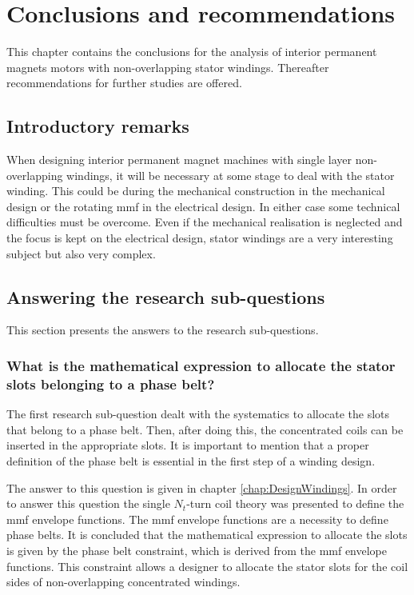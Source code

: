 \chapter{Conclusions and recommendations}\label{chap:ConlusionsRecommendations}
This chapter contains the conclusions for the analysis of interior permanent magnets motors with non-overlapping stator windings. Thereafter recommendations for further studies are offered.

\section{Introductory remarks}
When designing interior permanent magnet machines with single layer non-overlapping windings, it will be necessary at some stage to deal with the stator winding. This could be during the mechanical construction in the mechanical design or the rotating mmf in the electrical design. In either case some technical difficulties must be overcome. Even if the mechanical realisation is neglected and the focus is kept on the electrical design, stator windings are a very interesting subject but also very complex. 

\section{Answering the research sub-questions}
This section presents the answers to the research sub-questions.
 
\subsection[What is the mathematical expression to allocate the stator slots?]{What is the mathematical expression to allocate the stator slots belonging to a phase belt?}
The first research sub-question dealt with the systematics to allocate the slots that belong to a phase belt. Then, after doing this, the concentrated coils can be inserted in the appropriate slots. It is important to mention that a proper definition of the phase belt is essential in the first step of a winding design.

The answer to this question is given in chapter \ref{chap:DesignWindings}. In order to answer this question the single $N_t$-turn coil theory was presented to define the mmf envelope functions. The mmf envelope functions are a necessity to define phase belts. It is concluded that the mathematical expression to allocate the slots is given by the phase belt constraint, which is derived from the mmf envelope functions. This constraint allows a designer to allocate the stator slots for the coil sides of non-overlapping concentrated windings.   

